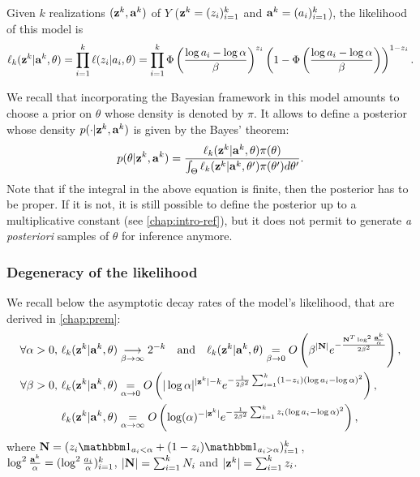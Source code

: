 Given $k$ realizations $(\mathbf{z}^k,\mathbf{a}^k)$ of $Y$ ($\mathbf{z}^k=(z_i)_{i=1}^k$ and $\mathbf{a}^k=(a_i)_{i=1}^k$), the likelihood of this model is
\begin{equation}\label{eq:constr-frag:likelihood}
    \ell_k(\mathbf{z}^k|\mathbf{a}^k,\theta) = \prod_{i=1}^k\ell(z_i|a_i,\theta) = \prod_{i=1}^k\Phi\left(\frac{\log a_i-\log\alpha}{\beta}\right)^{z_i}\left(1-\Phi\left(\frac{\log a_i-\log\alpha}{\beta}\right)\right)^{1-z_i}.
\end{equation}






We recall that incorporating the Bayesian framework in this model amounts to choose a prior on $\theta$ whose density is denoted by $\pi$.
It allows to define a posterior whose density $p(\cdot|\mathbf{z}^k,\mathbf{a}^k)$ is given by the Bayes' theorem:
\begin{equation}\label{eq:constr-frag:posterior}
    p(\theta|\mathbf{z}^k,\mathbf{a}^k) = \frac{\ell_k(\mathbf{z}^k|\mathbf{a}^k,\theta)\pi(\theta)}{\int_{\Theta}\ell_k(\mathbf{z}^k|\mathbf{a}^k,\theta')\pi(\theta')d\theta'}.
\end{equation}
Note that if the integral in the above equation is finite, then the posterior has to be proper. If it is not, it is still possible to define the posterior up to a multiplicative constant (see   \cref{chap:intro-ref}), but it does not permit to generate \emph{a posteriori} samples of $\theta$ for inference anymore.




\subsubsection{Degeneracy of the likelihood}

We recall below the asymptotic decay rates of the model's likelihood, that are derived in   \cref{chap:prem}:
\begin{align}
    \forall\alpha>0,\, \ell_k(\mathbf{z}^k|\mathbf{a}^k,\theta) &\overset{\ }{\underset{\beta\rightarrow\infty}{\longrightarrow}}2^{-k}\quad\text{and}\quad
        \ell_k(\mathbf{z}^k|\mathbf{a}^k,\theta) \overset{}{\underset{\beta\rightarrow0}{=}}O\left(\beta^{|\mathbf{N}|}e^{-\frac{\mathbf{N}^T\log^2\frac{\mathbf{a}^k}{\alpha}}{2\beta^2}}\right) ,\\
    \forall\beta>0,\, \ell_k(\mathbf{z}^k|\mathbf{a}^k,\theta)  &\overset{}{\underset{\alpha\rightarrow0}{=}}  O\left(|\log\alpha|^{|\mathbf{z}^k|-k} e^{-\frac{1}{2\beta^2}\sum_{i=1}^k (1-z_i)(\log a_i-\log\alpha)^2} \right),\\
    \ell_k(\mathbf{z}^k|\mathbf{a}^k,\theta) &\overset{}{\underset{\alpha\rightarrow\infty}{=}}  O\left(\log(\alpha)^{-|\mathbf{z}^k|} e^{-\frac{1}{2\beta^2}\sum_{i=1}^k z_i(\log a_i-\log\alpha)^2} \right) ,
\end{align}
where $\mbf N=(z_i\indic_{a_i<\alpha}+(1-z_i)\indic_{a_i>\alpha})_{i=1}^k$, $\log^2\frac{\mathbf{a}^k}{\alpha}=(\log^2\frac{a_i}{\alpha})_{i=1}^k$, 
    $|\mathbf{N}|=\sum_{i=1}^kN_i$ and
    $|\mathbf{z}^k|=\sum_{i=1}^kz_i$. %

